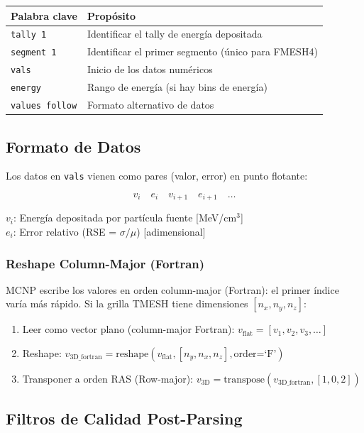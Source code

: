 \documentclass[12pt,a4paper]{article}
\newcommand{\vardef}[2]{\noindent\textbf{#1}: #2\\}
\begin{document}
\begin{tabular}{p{4cm} p{11cm}}
\toprule
\textbf{Palabra clave} & \textbf{Propósito} \\
\midrule
\texttt{tally 1} & Identificar el tally de energía depositada \\
\texttt{segment 1} & Identificar el primer segmento (único para FMESH4) \\
\texttt{vals} & Inicio de los datos numéricos \\
\texttt{energy} & Rango de energía (si hay bins de energía) \\
\texttt{values follow} & Formato alternativo de datos \\
\bottomrule
\end{tabular}

\subsection{Formato de Datos}

Los datos en \texttt{vals} vienen como pares (valor, error) en punto flotante:

$$v_i \quad e_i \quad v_{i+1} \quad e_{i+1} \quad \ldots$$

\vardef{$v_i$}{Energía depositada por partícula fuente [MeV/cm$^3$]}
\vardef{$e_i$}{Error relativo (RSE = $\sigma / \mu$) [adimensional]}

\subsubsection{Reshape Column-Major (Fortran)}

MCNP escribe los valores en orden column-major (Fortran): el primer índice varía más rápido. Si la grilla TMESH tiene dimensiones $[n_x, n_y, n_z]$:

\begin{enumerate}
  \item Leer como vector plano (column-major Fortran): $v_{\text{flat}} = [v_1, v_2, v_3, \ldots]$
  \item Reshape: $v_{\text{3D\_fortran}} = \text{reshape}(v_{\text{flat}}, [n_y, n_x, n_z], \text{order=`F'})$
  \item Transponer a orden RAS (Row-major): $v_{\text{3D}} = \text{transpose}(v_{\text{3D\_fortran}}, [1, 0, 2])$
\end{enumerate}

\subsection{Filtros de Calidad Post-Parsing}
\end{document}
